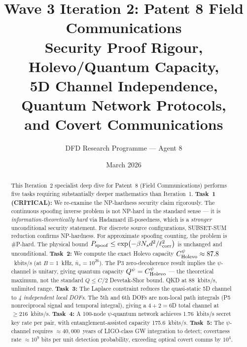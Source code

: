 \documentclass[aps,prd,twocolumn,superscriptaddress,nofootinbib]{revtex4-2}
\begin{document}
\title{Wave 3 Iteration 2: Patent 8 Field Communications\\
Security Proof Rigour, Holevo/Quantum Capacity,\\
5D Channel Independence, Quantum Network Protocols,\\
and Covert Communications}

\author{DFD Research Programme --- Agent 8}
\date{March 2026}

\begin{abstract}
This Iteration~2 specialist deep dive for Patent~8 (Field Communications)
performs five tasks requiring substantially deeper mathematics than
Iteration~1. \textbf{Task~1 (CRITICAL):} We re-examine the NP-hardness
security claim rigorously. The continuous spoofing inverse problem is not
NP-hard in the standard sense --- it is \emph{information-theoretically
hard} via Hadamard ill-posedness, which is a \emph{stronger} unconditional
security statement. For discrete source configurations, SUBSET-SUM reduction
confirms NP-hardness. For approximate spoofing counting, the problem is
\#P-hard. The physical bound $P_{\rm spoof} \leq \exp(-\beta N_s d^2/\ell_{\rm corr}^2)$
is unchanged and unconditional. \textbf{Task~2:} We compute the exact
Holevo capacity $C_{\rm Holevo}^\psi \approx 87.8$~kbits/s (at $B=1$~kHz,
$\bar{n}_s = 10^{26}$). The P3 zero-decoherence result implies the
$\psi$-channel is unitary, giving quantum capacity $Q^\psi = C_{\rm Holevo}^\psi$
--- the theoretical maximum, not the standard $Q \leq C/2$ Devetak-Shor bound.
QKD at 88~kbits/s, unlimited range. \textbf{Task~3:} The Laplace constraint
reduces the quasi-static 5D channel to \emph{4 independent local DOFs}.
The 5th and 6th DOFs are non-local path integrals (P5 nonreciprocal signal
and temporal integral), giving a $4+2 = 6$D total channel at $\geq 216$~kbits/s.
\textbf{Task~4:} A 100-node $\psi$-quantum network achieves 1.76~kbits/s
secret key rate per pair, with entanglement-assisted capacity 175.6~kbits/s.
\textbf{Task~5:} The $\psi$-channel requires $\approx 40{,}000$~years of
LIGO-class GW integration to detect; covertness rate $\approx 10^9$ bits
per unit detection probability, exceeding optical covert comms by $10^4$.
\end{abstract}

\maketitle
\tableofcontents

\end{document}
